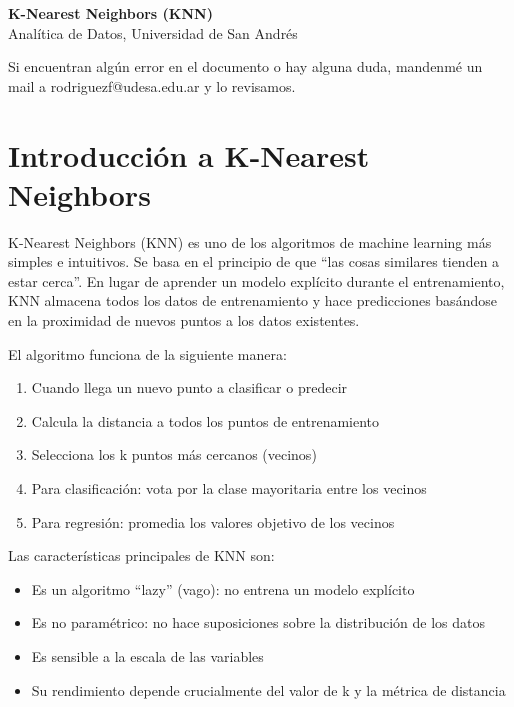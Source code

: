 \documentclass[12pt]{article}
\begin{document}
\begin{center}
  {\LARGE \textbf{K-Nearest Neighbors (KNN)}}\\[0.5em]
  {Analítica de Datos, Universidad de San Andrés}
\end{center}

Si encuentran algún error en el documento o hay alguna duda, mandenmé un mail a rodriguezf@udesa.edu.ar y lo revisamos.

\section{Introducción a K-Nearest Neighbors}

K-Nearest Neighbors (KNN) es uno de los algoritmos de machine learning más simples e intuitivos. Se basa en el principio de que ``las cosas similares tienden a estar cerca''. En lugar de aprender un modelo explícito durante el entrenamiento, KNN almacena todos los datos de entrenamiento y hace predicciones basándose en la proximidad de nuevos puntos a los datos existentes.

\vspace{1em}

El algoritmo funciona de la siguiente manera:

\begin{enumerate}
    \item Cuando llega un nuevo punto a clasificar o predecir
    \item Calcula la distancia a todos los puntos de entrenamiento
    \item Selecciona los k puntos más cercanos (vecinos)
    \item Para clasificación: vota por la clase mayoritaria entre los vecinos
    \item Para regresión: promedia los valores objetivo de los vecinos
\end{enumerate}

\vspace{1em}

Las características principales de KNN son:
\begin{itemize}
    \item Es un algoritmo ``lazy'' (vago): no entrena un modelo explícito
    \item Es no paramétrico: no hace suposiciones sobre la distribución de los datos
    \item Es sensible a la escala de las variables
    \item Su rendimiento depende crucialmente del valor de k y la métrica de distancia
\end{itemize}
\end{document}
